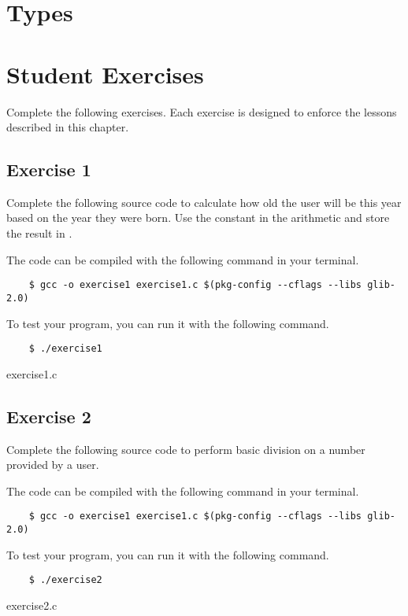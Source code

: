 \section{Types}


\section{Student Exercises}

Complete the following exercises. Each exercise is designed to enforce the
lessons described in this chapter.


\subsection{Exercise 1}
Complete the following source code to calculate how old the user will be this
year based on the year they were born. Use the constant  in
the arithmetic and store the result in .

The code can be compiled with the following command in your terminal.

\begin{Verbatim}
    $ gcc -o exercise1 exercise1.c $(pkg-config --cflags --libs glib-2.0)
\end{Verbatim}

To test your program, you can run it with the following command.

\begin{Verbatim}
    $ ./exercise1
\end{Verbatim}

\begin{code}{exercise1.c}

\end{code}


\subsection{Exercise 2}
Complete the following source code to perform basic division on a number
provided by a user.

The code can be compiled with the following command in your terminal.

\begin{Verbatim}
    $ gcc -o exercise1 exercise1.c $(pkg-config --cflags --libs glib-2.0)
\end{Verbatim}

To test your program, you can run it with the following command.

\begin{Verbatim}
    $ ./exercise2
\end{Verbatim}

\begin{code}{exercise2.c}

\end{code}
